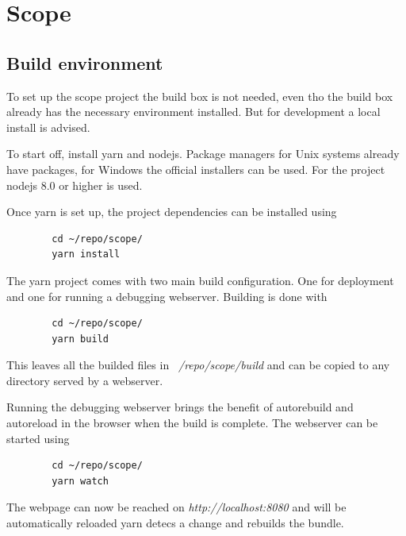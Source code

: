 
\chapter{Scope} %
\label{ch:devguide:scope}

\section{Build environment}

To set up the scope project the build box is not needed, even tho the build box already has the necessary environment installed.
But for development a local install is advised.

To start off, install yarn and nodejs. Package managers for Unix systems already have packages, for Windows the official installers can be used. For the project nodejs 8.0 or higher is used.

Once yarn is set up, the project dependencies can be installed using

\begin{listing}
    \begin{verbatim}
        cd ~/repo/scope/
        yarn install
    \end{verbatim}
\end{listing}

The yarn project comes with two main build configuration. One for deployment and one for running a debugging webserver. Building is done with

\begin{listing}
    \begin{verbatim}
        cd ~/repo/scope/
        yarn build
    \end{verbatim}
\end{listing}

This leaves all the builded files in \textit{~/repo/scope/build} and can be copied to any directory served by a webserver.

Running the debugging webserver brings the benefit of autorebuild and autoreload in the browser when the build is complete. The webserver can be started using

\begin{listing}
    \begin{verbatim}
        cd ~/repo/scope/
        yarn watch
    \end{verbatim}
\end{listing}

The webpage can now be reached on \textit{http://localhost:8080} and will be automatically reloaded yarn detecs a change and rebuilds the bundle.


